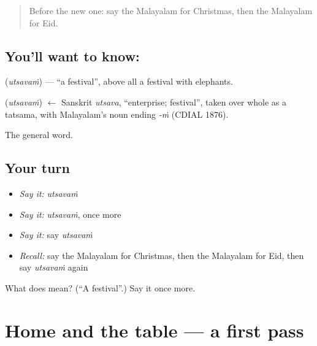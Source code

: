 \label{lesson:ML-C141-utsavam}



\begin{quote}
Before the new one: say the Malayalam for Christmas, then the Malayalam for Eid.
\end{quote}

\subsection*{You'll want to know: }
\textbf{} (\emph{utsavaṁ}) — \textquotedblleft{}a festival\textquotedblright{}, above all a \textbf{} festival with elephants.

\begin{cousinweb}
\textbf{} (\emph{utsavaṁ}) $\leftarrow$ Sanskrit \emph{utsava}, \textquotedblleft{}enterprise; festival\textquotedblright{}, taken over whole as a tatsama, with Malayalam's noun ending \emph{-ṁ} (CDIAL 1876).
\end{cousinweb}

\begin{grammarlens}[title={What you've built}]
The general word.
\end{grammarlens}

\subsection*{Your turn}
\begin{itemize}
\raggedright
  \item \emph{Say it:} \emph{utsavaṁ}
  \item \emph{Say it:} \emph{utsavaṁ}, once more
  \item \emph{Say it:} say \emph{utsavaṁ}
  \item \emph{Recall:} say the Malayalam for Christmas, then the Malayalam for Eid, then say \emph{utsavaṁ} again
\end{itemize}

\begin{tcolorbox}[breakable,colback=teal!4,colframe=teal!35!black,title={Before you move on}]
What does  mean? (\textquotedblleft{}A festival\textquotedblright{}.) Say it once more.
\end{tcolorbox}
\section[(dialogue)]{Home and the table — a first pass}

